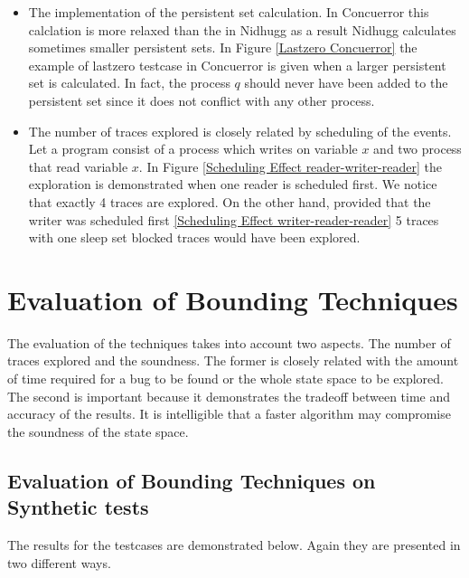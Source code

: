 \begin{itemize}
  \item The implementation of the persistent set calculation. In Concuerror this calclation is more relaxed than the in Nidhugg as a result 
  Nidhugg calculates sometimes smaller persistent sets. In Figure \ref{Lastzero Concuerror} the example of lastzero testcase in Concuerror is given when a 
  larger persistent set is calculated. In fact, the process $q$ should never have been added to the persistent set since it does not conflict with any other
  process.

  \item The number of traces explored is closely related by scheduling of the events. Let a program consist of a process which writes on 
  variable $x$ and two process that read variable $x$. In Figure \ref{Scheduling Effect reader-writer-reader} the exploration is demonstrated when
  one reader is scheduled first. We notice that exactly 4 traces are explored. On the other hand, provided that the writer was scheduled first 
  \ref{Scheduling Effect writer-reader-reader} 5 traces with one sleep set blocked traces would have been explored.

\end{itemize}




\section{Evaluation of Bounding Techniques}
The evaluation of the techniques takes into account two aspects. The number of traces explored and the soundness. The former is closely related with the amount
of time required for a bug to be found or the whole state space to be explored. The second is important because it demonstrates the tradeoff between time and accuracy
of the results. It is intelligible that a faster algorithm may compromise the soundness of the state space.
\subsection{Evaluation of Bounding Techniques on Synthetic tests}

The results for the testcases are demonstrated below. Again they are presented in two different ways.

